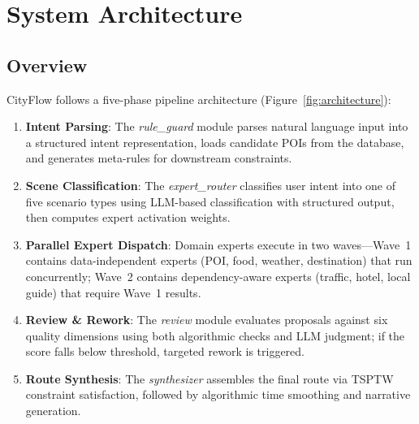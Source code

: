 \section{System Architecture}
\label{sec:method}

\subsection{Overview}

CityFlow follows a five-phase pipeline architecture (Figure~\ref{fig:architecture}):

\begin{enumerate}[leftmargin=*]
    \item \textbf{Intent Parsing}: The \textit{rule\_guard} module parses natural language input into a structured intent representation, loads candidate POIs from the database, and generates meta-rules for downstream constraints.
    \item \textbf{Scene Classification}: The \textit{expert\_router} classifies user intent into one of five scenario types using LLM-based classification with structured output, then computes expert activation weights.
    \item \textbf{Parallel Expert Dispatch}: Domain experts execute in two waves---Wave~1 contains data-independent experts (POI, food, weather, destination) that run concurrently; Wave~2 contains dependency-aware experts (traffic, hotel, local guide) that require Wave~1 results.
    \item \textbf{Review \& Rework}: The \textit{review} module evaluates proposals against six quality dimensions using both algorithmic checks and LLM judgment; if the score falls below threshold, targeted rework is triggered.
    \item \textbf{Route Synthesis}: The \textit{synthesizer} assembles the final route via TSPTW constraint satisfaction, followed by algorithmic time smoothing and narrative generation.
\end{enumerate}

